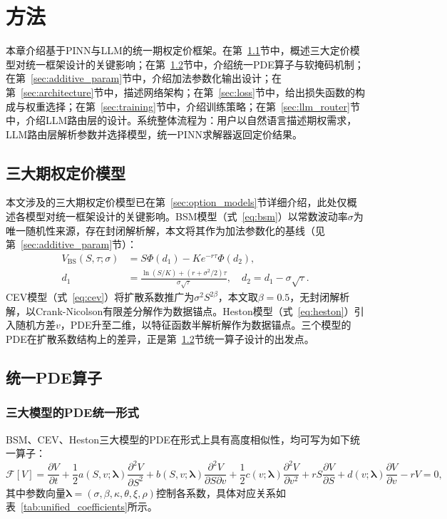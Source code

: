 \chapter{方法}\label{chap:method}

本章介绍基于PINN与LLM的统一期权定价框架。在第~\ref{sec:three_models}节中，概述三大定价模型对统一框架设计的关键影响；在第~\ref{sec:unified_pde}节中，介绍统一PDE算子与软掩码机制；在第~\ref{sec:additive_param}节中，介绍加法参数化输出设计；在第~\ref{sec:architecture}节中，描述网络架构；在第~\ref{sec:loss}节中，给出损失函数的构成与权重选择；在第~\ref{sec:training}节中，介绍训练策略；在第~\ref{sec:llm_router}节中，介绍LLM路由层的设计。系统整体流程为：用户以自然语言描述期权需求，LLM路由层解析参数并选择模型，统一PINN求解器返回定价结果。

\section{三大期权定价模型}\label{sec:three_models}

本文涉及的三大期权定价模型已在第~\ref{sec:option_models}节详细介绍，此处仅概述各模型对统一框架设计的关键影响。BSM模型（式~\eqref{eq:bsm}）以常数波动率$\sigma$为唯一随机性来源，存在封闭解析解，本文将其作为加法参数化的基线（见第~\ref{sec:additive_param}节）：
\begin{align}
  V_\text{BS}(S,\tau;\sigma) &= S\Phi(d_1) - Ke^{-r\tau}\Phi(d_2), \label{eq:bs_formula}\\
  d_1 &= \frac{\ln(S/K)+(r+\sigma^2/2)\tau}{\sigma\sqrt{\tau}}, \quad d_2 = d_1 - \sigma\sqrt{\tau}.
\end{align}
CEV模型（式~\eqref{eq:cev}）将扩散系数推广为$\sigma^2 S^{2\beta}$，本文取$\beta=0.5$，无封闭解析解，以Crank-Nicolson有限差分解作为数据锚点。Heston模型（式~\eqref{eq:heston}）引入随机方差$v$，PDE升至二维，以特征函数半解析解作为数据锚点。三个模型的PDE在扩散系数结构上的差异，正是第~\ref{sec:unified_pde}节统一算子设计的出发点。

\section{统一PDE算子}\label{sec:unified_pde}

\subsection{三大模型的PDE统一形式}

BSM、CEV、Heston三大模型的PDE在形式上具有高度相似性，均可写为如下统一算子：
\begin{equation}\label{eq:unified_pde}
  \mathcal{F}[V] =
    \frac{\partial V}{\partial t}
    + \frac{1}{2}a(S,v;\boldsymbol{\lambda})\frac{\partial^2 V}{\partial S^2}
    + b(S,v;\boldsymbol{\lambda})\frac{\partial^2 V}{\partial S\partial v}
    + \frac{1}{2}c(v;\boldsymbol{\lambda})\frac{\partial^2 V}{\partial v^2}
    + rS\frac{\partial V}{\partial S}
    + d(v;\boldsymbol{\lambda})\frac{\partial V}{\partial v}
    - rV = 0,
\end{equation}
其中参数向量$\boldsymbol{\lambda}=(\sigma,\beta,\kappa,\theta,\xi,\rho)$控制各系数，具体对应关系如表~\ref{tab:unified_coefficients}所示。


